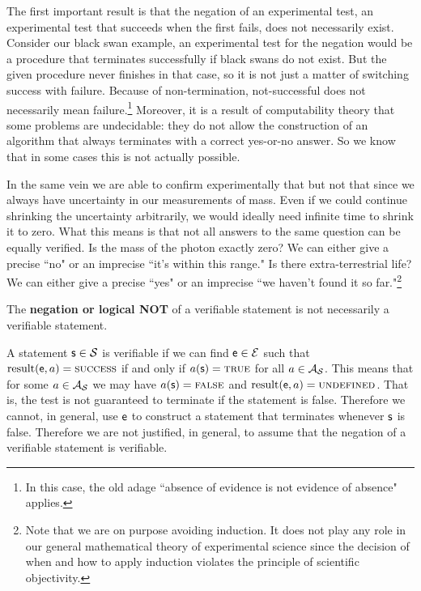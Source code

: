 	The first important result is that the negation of an experimental test, an experimental test that succeeds when the first fails, does not necessarily exist. Consider our black swan example, an experimental test for the negation would be a procedure that terminates successfully if black swans do not exist. But the given procedure never finishes in that case, so it is not just a matter of switching success with failure. Because of non-termination, not-successful does not necessarily mean failure.\footnote{In this case, the old adage ``absence of evidence is not evidence of absence" applies.} Moreover, it is a result of computability theory that some problems are undecidable: they do not allow the construction of an algorithm that always terminates with a correct yes-or-no answer. So we know that in some cases this is not actually possible.
	
	In the same vein we are able to confirm experimentally that  but not that  since we always have uncertainty in our measurements of mass. Even if we could continue shrinking the uncertainty arbitrarily, we would ideally need infinite time to shrink it to zero. What this means is that not all answers to the same question can be equally verified. Is the mass of the photon exactly zero? We can either give a precise ``no" or an imprecise ``it's within this range." Is there extra-terrestrial life? We can either give a precise ``yes" or an imprecise ``we haven't found it so far."\footnote{Note that we are on purpose avoiding induction. It does not play any role in our general mathematical theory of experimental science since the decision of when and how to apply induction violates the principle of scientific objectivity.}
	
	\begin{mathSection}
		\begin{remark}
			The \textbf{negation or logical NOT} of a verifiable statement is not necessarily a verifiable statement.
		\end{remark}
		
		\begin{justification}
			A statement $\mathsf{s} \in \mathcal{S}$ is verifiable if we can find $\mathsf{e} \in \mathcal{E}$ such that $\operatorname{result}(\mathsf{e}, a) = \textsc{success}$ if and only if $a(\mathsf{s}) = \textup{\textsc{true}}$ for all $a \in \mathcal{A}_{\mathcal{S}}$. This means that for some $a \in \mathcal{A}_{\mathcal{S}}$ we may have $a(\mathsf{s}) = \textup{\textsc{false}}$ and $\operatorname{result}(\mathsf{e}, a) = \textsc{undefined}$. That is, the test is not guaranteed to terminate if the statement is false. Therefore we cannot, in general, use $\mathsf{e}$ to construct a statement that terminates whenever $\mathsf{s}$ is false. Therefore we are not justified, in general, to assume that the negation of a verifiable statement is verifiable.
		\end{justification}
	\end{mathSection}
	
